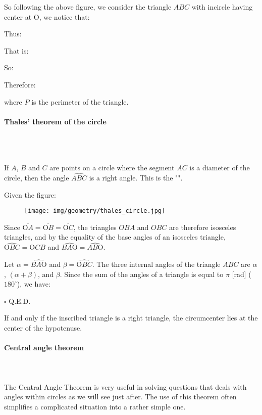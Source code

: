 	So following the above figure, we consider the triangle $ABC$ with incircle having center at O, we notice that:
	
	Thus:
	
	That is:
	
	So:
	
	Therefore:
	
	where $P$ is the perimeter of the triangle.
	
	\pagebreak
	\paragraph{Thales' theorem of the circle}\mbox{}\\\\
	\begin{theorem}
	If $A$, $B$ and $C$ are points on a circle where the segment $\overline{AC}$ is a diameter of the circle, then the angle $\widehat{ABC}$ is a right angle. This is the "".
	\end{theorem}
	\begin{dem}
	Given the figure:
	\begin{figure}[H]
		\centering
		\texttt{[image: img/geometry/thales\_circle.jpg]}
	\end{figure}	
	Since $\overline{\text{O}A} = \overline{\text{O}B} = \overline{\text{O}C}$, the triangles $OBA$ and $OBC$ are therefore isosceles triangles, and by the equality of the base angles of an isosceles triangle, $\widehat{\text{O}BC} = \widehat{\text{O}CB}$ and $\widehat{BA\text{O}} = \widehat{AB\text{O}}$.

	Let $\alpha = \widehat{BA\text{O}}$ and $\beta = \widehat{\text{O}BC}$. The three internal angles of the  triangle $ABC$ are $\alpha$, $(\alpha + \beta)$, and $\beta$. Since the sum of the angles of a triangle is equal to $\pi$ [rad] ($180^\circ$), we have:
	
	\begin{flushright}
		$\square$  Q.E.D.
	\end{flushright}
	\end{dem}
	\begin{corollary}
	If and only if the inscribed triangle is a right triangle, the circumcenter lies at the center of the hypotenuse.
	\end{corollary}
	
	\pagebreak
	\paragraph{Central angle theorem}\mbox{}\\\\
	The Central Angle Theorem is very useful in solving questions that deals with angles within circles as we will see just after. The use of this theorem often simplifies a complicated situation into a rather simple one.
	
